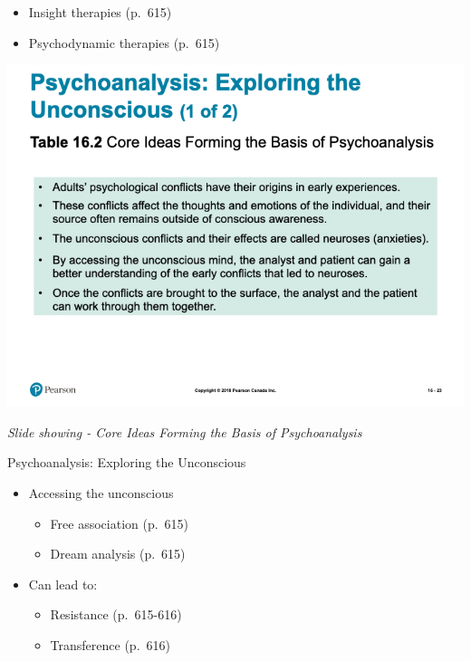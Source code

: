 \documentclass[
]{book}
\providecommand{\tightlist}{%
  \setlength{\itemsep}{0pt}\setlength{\parskip}{0pt}}
\begin{document}
\begin{reflect}
\begin{itemize}
\tightlist
\item
  Insight therapies (p.~615)\\
\item
  Psychodynamic therapies (p.~615)
\end{itemize}

\includegraphics{assets/unit_11/slide_23.png}

\emph{Slide showing - Core Ideas Forming the Basis of Psychoanalysis}

Psychoanalysis: Exploring the Unconscious

\begin{itemize}
\tightlist
\item
  Accessing the unconscious

  \begin{itemize}
  \tightlist
  \item
    Free association (p.~615)\\
  \item
    Dream analysis (p.~615)\\
  \end{itemize}
\item
  Can lead to:

  \begin{itemize}
  \tightlist
  \item
    Resistance (p.~615-616)\\
  \item
    Transference (p.~616)
  \end{itemize}
\end{itemize}


\end{reflect}
\end{document}
